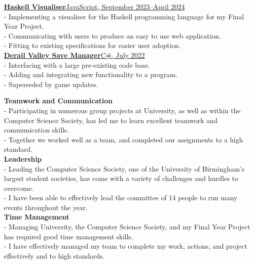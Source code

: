 \documentclass[twoside]{article}
\begin{document}
\href{https://github.com/FrozenDude101/masters-project}{\textbf{Haskell Visualiser}\hfill JavaScript, September 2023--April 2024}\\
- Implementing a visualiser for the Haskell programming language for my Final Year Project.\\
- Communicating with users to produce an easy to use web application.\\
- Fitting to existing specifications for easier user adoption.\vspace{2pt}\\
\href{https://github.com/FrozenDude101/DV-SaveManager}{\textbf{Derail Valley Save Manager}\hfill C\#, July 2022}\\
- Interfacing with a large pre-existing code base.\\
- Adding and integrating new functionality to a program.\\
- Superseded by game updates.

\textbf{Teamwork and Communication}\\
- Participating in numerous group projects at University, as well as within the Computer Science Society, has led me to learn excellent teamwork and communication skills.\\
- Together we worked well as a team, and completed our assignments to a high standard.\vspace{2pt}\\
\textbf{Leadership}\\
- Leading the Computer Science Society, one of the University of Birmingham's largest student societies, has come with a variety of challenges and hurdles to overcome.\\
- I have been able to effectively lead the committee of 14 people to run many events throughout the year.\vspace{2pt}\\
\textbf{Time Management}\\
- Managing University, the Computer Science Society, and my Final Year Project has required good time management skills.\\
- I have effectively managed my team to complete my work, actions, and project effectively and to high standards.\vspace{2pt}
\end{document}
